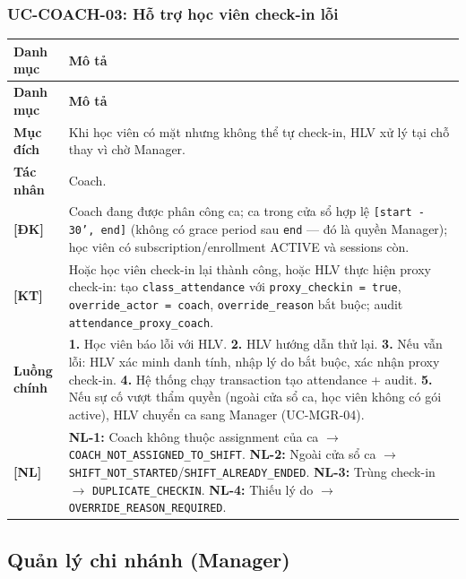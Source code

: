 \subsubsection{UC-COACH-03: Hỗ trợ học viên check-in lỗi}
\begingroup
\renewcommand{\arraystretch}{1.3}
\begin{longtable}{|>{\centering\arraybackslash}m{3cm}|>{\raggedright\arraybackslash}m{12cm}|}
\hline
\textbf{Danh mục} & \textbf{Mô tả} \\ \hline
\endfirsthead
\hline
\textbf{Danh mục} & \textbf{Mô tả} \\ \hline
\endhead
\hline
\endfoot
\textbf{Mục đích} & Khi học viên có mặt nhưng không thể tự check-in, HLV xử lý tại chỗ thay vì chờ Manager. \\
\hline
\textbf{Tác nhân} & Coach. \\
\hline
\textbf{[ĐK]} & Coach đang được phân công ca; ca trong cửa sổ hợp lệ \texttt{[start - 30', end]} (không có grace period sau \texttt{end} — đó là quyền Manager); học viên có subscription/enrollment ACTIVE và sessions còn. \\
\hline
\textbf{[KT]} & Hoặc học viên check-in lại thành công, hoặc HLV thực hiện proxy check-in: tạo \texttt{class\_attendance} với \texttt{proxy\_checkin = true}, \texttt{override\_actor = coach}, \texttt{override\_reason} bắt buộc; audit \texttt{attendance\_proxy\_coach}. \\
\hline
\textbf{Luồng chính} & \textbf{1.} Học viên báo lỗi với HLV. \textbf{2.} HLV hướng dẫn thử lại. \textbf{3.} Nếu vẫn lỗi: HLV xác minh danh tính, nhập lý do bắt buộc, xác nhận proxy check-in. \textbf{4.} Hệ thống chạy transaction tạo attendance + audit. \textbf{5.} Nếu sự cố vượt thẩm quyền (ngoài cửa sổ ca, học viên không có gói active), HLV chuyển ca sang Manager (UC-MGR-04). \\
\hline
\textbf{[NL]} & \textbf{NL-1:} Coach không thuộc assignment của ca $\rightarrow$ \texttt{COACH\_NOT\_ASSIGNED\_TO\_SHIFT}. \textbf{NL-2:} Ngoài cửa sổ ca $\rightarrow$ \texttt{SHIFT\_NOT\_STARTED}/\texttt{SHIFT\_ALREADY\_ENDED}. \textbf{NL-3:} Trùng check-in $\rightarrow$ \texttt{DUPLICATE\_CHECKIN}. \textbf{NL-4:} Thiếu lý do $\rightarrow$ \texttt{OVERRIDE\_REASON\_REQUIRED}. \\
\hline
\end{longtable}
\endgroup

\subsection{Quản lý chi nhánh (Manager)}

